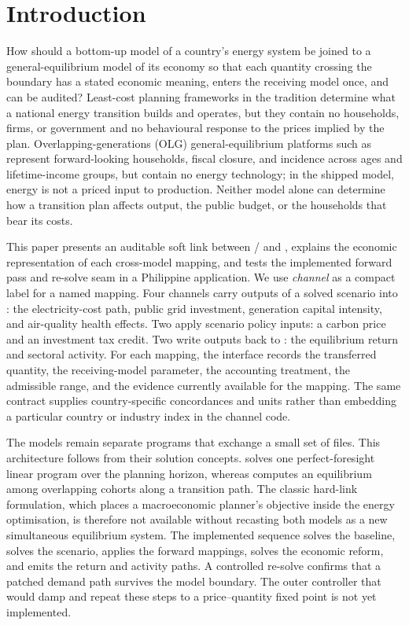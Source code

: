 \section{Introduction}
\label{sec:intro}

How should a bottom-up model of a country's energy system be joined to a
general-equilibrium model of its economy so that each quantity crossing the boundary has
a stated economic meaning, enters the receiving model once, and can be audited?
Least-cost planning frameworks in the \CLEWS{} tradition
\citep{howells_clews_2013,howells_osemosys_2011} determine what a national energy
transition builds and operates, but they contain no households, firms, or government and
no behavioural response to the prices implied by the plan. Overlapping-generations (OLG)
general-equilibrium platforms such as \OGCore{} \citep{debacker_evans_ogcore} represent
forward-looking households, fiscal closure, and incidence across ages and lifetime-income
groups, but contain no energy technology; in the shipped model, energy is not a priced
input to production. Neither model alone can determine how a transition plan affects
output, the public budget, or the households that bear its costs.

This paper presents an auditable soft link between \CLEWS{}/\OSeMOSYS{} and \OGCore{},
explains the economic representation of each cross-model mapping, and tests the
implemented forward pass and re-solve seam in a Philippine application. We use
\emph{channel} as a compact label for a named mapping. Four channels carry outputs of a
solved \CLEWS{} scenario into \OGCore{}: the electricity-cost path, public grid
investment, generation capital intensity, and air-quality health effects. Two apply
scenario policy inputs: a carbon price and an investment tax credit. Two write
\OGCore{} outputs back to \CLEWS{}: the equilibrium return and sectoral activity. For
each mapping, the interface records the transferred quantity, the receiving-model
parameter, the accounting treatment, the admissible range, and the evidence currently
available for the mapping. The same contract supplies country-specific concordances and
units rather than embedding a particular country or industry index in the channel code.

The models remain separate programs that exchange a small set of files. This architecture
follows from their solution concepts. \OSeMOSYS{} solves one perfect-foresight linear
program over the planning horizon, whereas \OGCore{} computes an equilibrium among
overlapping cohorts along a transition path. The classic hard-link formulation, which
places a macroeconomic planner's objective inside the energy optimisation, is therefore
not available without recasting both models as a new simultaneous equilibrium system.
The implemented sequence solves the \OGCore{} baseline, solves the \CLEWS{} scenario,
applies the forward mappings, solves the economic reform, and emits the return and
activity paths. A controlled \CLEWS{} re-solve confirms that a patched demand path
survives the model boundary. The outer controller that would damp and repeat these steps
to a price--quantity fixed point is not yet implemented.

